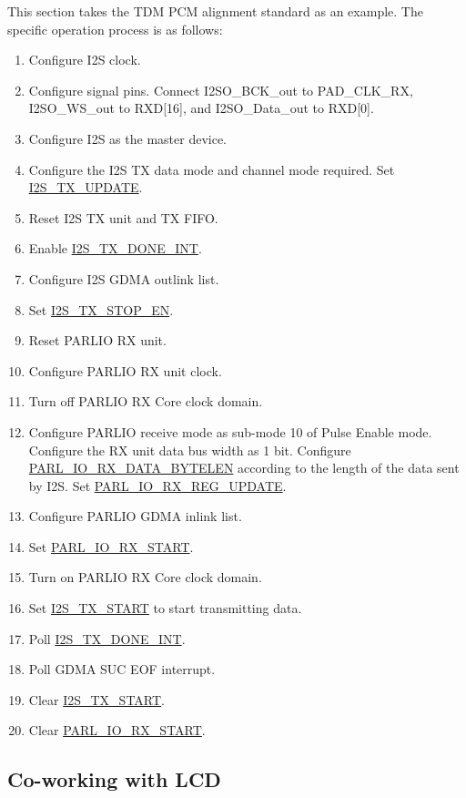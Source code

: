 \documentclass[main\_\_EN.tex]{subfiles}
\begin{document}
This section takes the TDM PCM alignment standard as an example. The specific operation process is as follows:
\begin{enumerate}
    \item Configure I2S clock.
    \item Configure signal pins. Connect I2SO\_BCK\_out to PAD\_CLK\_RX, I2SO\_WS\_out to RXD[16], and I2SO\_Data\_out to RXD[0].
    \item Configure I2S as the master device.
    \item Configure the I2S TX data mode and channel mode required. Set \hyperref[fielddesc:I2STXUPDATE]{I2S\_TX\_UPDATE}.
    \item Reset I2S TX unit and TX FIFO.
    \item Enable \hyperref[int:I2STXDONEINT]{I2S\_TX\_DONE\_INT}. 
    \item Configure I2S GDMA outlink list.
    \item Set \hyperref[fielddesc:I2STXSTOPEN]{I2S\_TX\_STOP\_EN}.
    \item Reset PARLIO RX unit.
    \item Configure PARLIO RX unit clock.
    \item Turn off PARLIO RX Core clock domain.
    \item Configure PARLIO receive mode as sub-mode 10 of Pulse Enable mode. Configure the RX unit data bus width as 1 bit. Configure \hyperref[fielddesc:PARLIORXDATABYTELEN]{PARL\_IO\_RX\_DATA\_BYTELEN} according to the length of the data sent by I2S. Set \hyperref[fielddesc:PARLIORXREGUPDATE]{PARL\_IO\_RX\_REG\_UPDATE}.
    \item Configure PARLIO GDMA inlink list.
    \item Set \hyperref[fielddesc:PARLIORXSTART]{PARL\_IO\_RX\_START}.
    \item Turn on PARLIO RX Core clock domain.
    \item Set \hyperref[fielddesc:I2STXSTART]{I2S\_TX\_START} to start transmitting data.
    \item Poll \hyperref[int:I2STXDONEINT]{I2S\_TX\_DONE\_INT}. 
    \item Poll GDMA SUC EOF interrupt.
    \item Clear \hyperref[fielddesc:I2STXSTART]{I2S\_TX\_START}.
    \item Clear \hyperref[fielddesc:PARLIORXSTART]{PARL\_IO\_RX\_START}.
\end{enumerate}

\subsection{Co-working with LCD}\label{parlio-lcd-data-trans}
\end{document}
